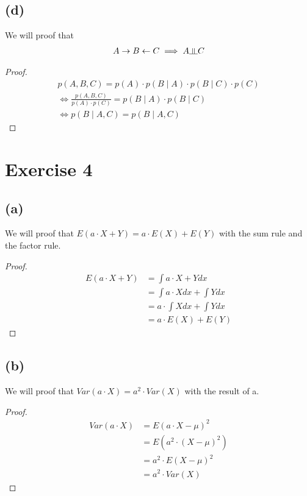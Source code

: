 \documentclass{article}
\newcommand{\dsep}{\rotatebox[origin=c]{90}{$\models$}}
\begin{document}
\subsection*{(d)}
We will proof that 
\begin{align*}
    A \rightarrow B \leftarrow C \implies A \dsep C 
\end{align*}
\begin{proof}
\begin{align*}
	p(A,B,C) = p(A) \cdot p(B \mid A) \cdot p(B \mid C) \cdot p(C) \\
	\Leftrightarrow \frac{p(A,B,C)}{p(A) \cdot p(C)} = p(B\mid A) \cdot p(B\mid C) \\
	\Leftrightarrow p(B \mid A,C) = p(B \mid A,C)
\end{align*}
\end{proof}

\section*{Exercise 4}
\subsection*{(a)}
 We will proof that $E(a \cdot X + Y) = a \cdot E(X) + E(Y) $ with the sum rule and the factor rule.
\begin{proof}
	\begin{align*}
	E(a \cdot X + Y)
	& = \int a \cdot X + Y dx \\
	&= \int a \cdot X dx + \int Y dx \\
	&= a \cdot \int X dx + \int Y dx \\
	&= a \cdot E(X) + E(Y)
	\end{align*}
\end{proof}

\subsection*{(b)}
We will proof that $Var(a \cdot X) = a^{2} \cdot Var(X)$ with the result of a.
\begin{proof}
	\begin{align*}
		Var(a \cdot X) 
		&= E(a \cdot X - \mu)^{2} \\
		&= E(a^{2} \cdot (X - \mu)^{2} )\\
		&= a^{2} \cdot E(X - \mu)^{2} \\
		&= a^{2} \cdot Var(X)
	\end{align*}
\end{proof}




\end{document}
